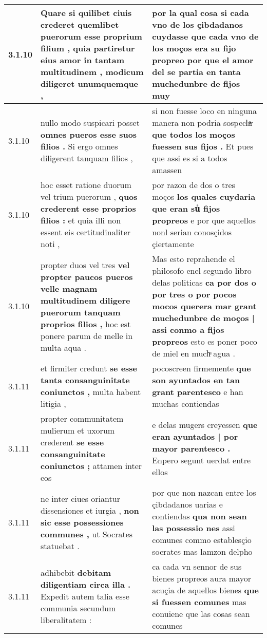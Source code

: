 \begin{tabular}{|p{1cm}|p{6.5cm}|p{6.5cm}|}
3.1.10 & Quare si quilibet ciuis crederet \textbf{ quemlibet puerorum esse proprium filium , quia partiretur eius amor in tantam multitudinem , } modicum diligeret unumquemque , & por la qual cosa si cada vno de los çibdadanos cuydasse que cada vno de los moços era su fijo propreo \textbf{ por que el amor del se partia en tanta muchedunbre de fijos } muy \\\hline
3.1.10 & nullo modo suspicari posset \textbf{ omnes pueros esse suos filios . } Si ergo omnes diligerent tanquam filios , & si non fuesse loco en ninguna manera non podria sospechͣr \textbf{ que todos los moços fuessen sus fijos . } Et pues que assi es si a todos amassen \\\hline
3.1.10 & hoc esset ratione duorum vel trium puerorum , \textbf{ quos crederent esse proprios filios : } et quia illi non essent eis certitudinaliter noti , & por razon de dos o tres moços \textbf{ los quales cuydaria que eran suᷤ fijos propreos } e por que aquellos nonl serian conosçidos çiertamente \\\hline
3.1.10 & propter duos vel tres \textbf{ vel propter paucos pueros velle magnam multitudinem diligere puerorum tanquam proprios filios , } hoc est ponere parum de melle in multa aqua . & Mas esto reprahende el philosofo enel segundo libro delas politicas \textbf{ ca por dos o por tres o por pocos mocos querera mar grant muchedunbre de moços | assi conmo a fijos propreos } esto es poner poco de miel en muchͣ agua . \\\hline
3.1.11 & et firmiter credunt \textbf{ se esse tanta consanguinitate coniunctos , } multa habent litigia , & pocoscreen firmemente \textbf{ que son ayuntados en tan grant parentesco } e han muchas contiendas \\\hline
3.1.11 & propter communitatem mulierum et uxorum crederent \textbf{ se esse consanguinitate coniunctos ; } attamen inter eos & e delas mugers creyessen \textbf{ que eran ayuntados | por mayor parentesco . } Enpero segunt uerdat entre ellos \\\hline
3.1.11 & ne inter ciues oriantur dissensiones et iurgia , \textbf{ non sic esse possessiones communes , } ut Socrates statuebat . & por que non nazcan entre los çibdadanos uarias e contiendas \textbf{ qua non sean las possessio nes } assi comunes commo establesçio socrates mas lamzon delpho \\\hline
3.1.11 & adhibebit \textbf{ debitam diligentiam circa illa . } Expedit autem talia esse communia secundum liberalitatem : & ca cada vn sennor de sus bienes propreos aura mayor acuçia de aquellos bienes \textbf{ que si fuessen comunes } mas conuiene que las cosas sean comunes \\\hline

\end{tabular}
